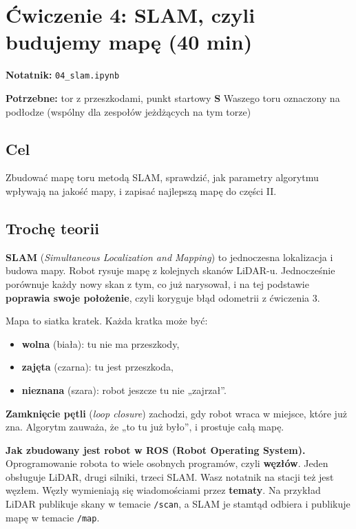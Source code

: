 \section{Ćwiczenie 4: SLAM, czyli budujemy mapę (40 min)}\label{ux107wiczenie-4-slam-czyli-budujemy-mapux119-40-min}

\textbf{Notatnik:} \texttt{04\_slam.ipynb}

\textbf{Potrzebne:} tor z przeszkodami, punkt startowy \textbf{S} Waszego toru oznaczony na podłodze (wspólny dla zespołów jeżdżących na tym torze)

\subsection{Cel}\label{cel}

Zbudować mapę toru metodą SLAM, sprawdzić, jak parametry algorytmu wpływają na jakość mapy, i zapisać najlepszą mapę do części II.

\subsection{Trochę teorii}\label{trochux119-teorii}

\textbf{SLAM} (\emph{Simultaneous Localization and Mapping}) to jednoczesna lokalizacja i budowa mapy. Robot rysuje mapę z kolejnych skanów LiDAR-u. Jednocześnie porównuje każdy nowy skan z tym, co już narysował, i na tej podstawie \textbf{poprawia swoje położenie}, czyli koryguje błąd odometrii z ćwiczenia 3.

Mapa to siatka kratek. Każda kratka może być:

\begin{itemize}
\tightlist
\item
  \textbf{wolna} (biała): tu nie ma przeszkody,
\item
  \textbf{zajęta} (czarna): tu jest przeszkoda,
\item
  \textbf{nieznana} (szara): robot jeszcze tu nie „zajrzał''.
\end{itemize}

\textbf{Zamknięcie pętli} (\emph{loop closure}) zachodzi, gdy robot wraca w miejsce, które już zna. Algorytm zauważa, że „to tu już było'', i prostuje całą mapę.

\textbf{Jak zbudowany jest robot w ROS (Robot Operating System).} Oprogramowanie robota to wiele osobnych programów, czyli \textbf{węzłów}. Jeden obsługuje LiDAR, drugi silniki, trzeci SLAM. Wasz notatnik na stacji też jest węzłem. Węzły wymieniają się wiadomościami przez \textbf{tematy}. Na przykład LiDAR publikuje skany w temacie \texttt{/scan}, a SLAM je stamtąd odbiera i publikuje mapę w temacie \texttt{/map}.

